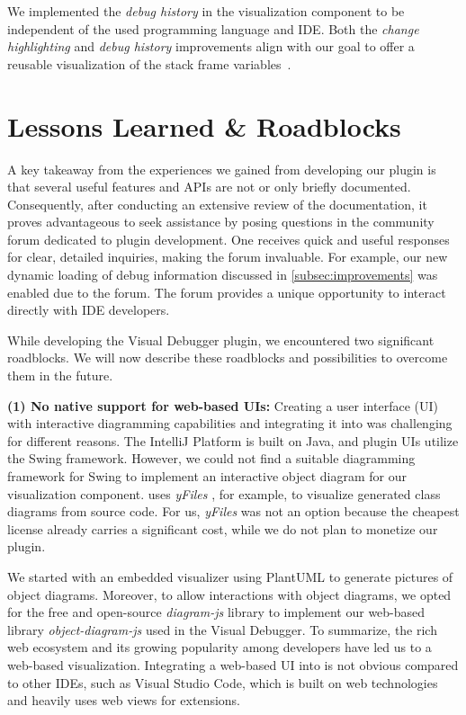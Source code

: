 \documentclass[sigconf]{acmart}
\begin{document}
We implemented the \textit{debug history} in the visualization component to be independent of the used programming language and IDE.
Both the \textit{change highlighting} and \textit{debug history} improvements align with our goal to offer a reusable visualization of the stack frame variables~\cite{krauterVisualDebuggerTool2022}.

\section{Lessons Learned \& Roadblocks} \label{sec:lessonsLearned}


A key takeaway from the experiences we gained from developing our plugin is that several useful features and APIs are not or only briefly documented.
Consequently, after conducting an extensive review of the documentation, it proves advantageous to seek assistance by posing questions in the community forum dedicated to plugin development. 
One receives quick and useful responses for clear, detailed inquiries, making the forum invaluable.
For example, our new dynamic loading of debug information discussed in \autoref{subsec:improvements} was enabled due to the \intellij{} forum.
The forum provides a unique opportunity to interact directly with IDE developers.

While developing the Visual Debugger plugin, we encountered two significant roadblocks.
We will now describe these roadblocks and possibilities to overcome them in the future.

\textbf{(1) No native support for web-based UIs:} Creating a user interface (UI) with interactive diagramming capabilities and integrating it into \intellij{} was challenging for different reasons.
The IntelliJ Platform is built on Java, and plugin UIs utilize the Swing framework.
However, we could not find a suitable diagramming framework for Swing to implement an interactive object diagram for our visualization component.
\intellij{} uses \textit{yFiles} \cite{yworksYFilesDiagrammingLibrary2023}, for example, to visualize generated class diagrams from source code.
For us, \textit{yFiles} was not an option because the cheapest license already carries a significant cost, while we do not plan to monetize our plugin.

We started with an embedded visualizer using PlantUML \cite{arnaudroquesPlantUML2023} to generate pictures of object diagrams.
Moreover, to allow interactions with object diagrams, we opted for the free and open-source \textit{diagram-js} library to implement our web-based library \textit{object-diagram-js} \cite{timkrauterObjectdiagramjs2023} used in the Visual Debugger.
To summarize, the rich web ecosystem and its growing popularity among developers have led us to a web-based visualization.
Integrating a web-based UI into \intellij{} is not obvious compared to other IDEs, such as Visual Studio Code, which is built on web technologies and heavily uses web views for extensions.
\end{document}
